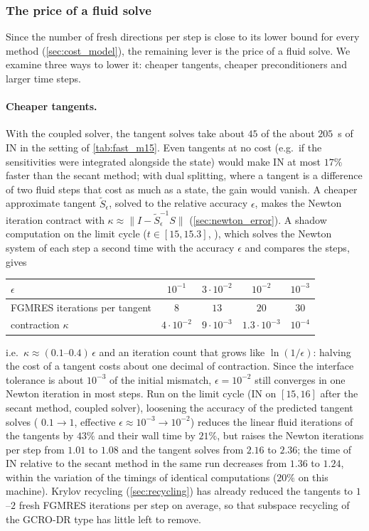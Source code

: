 \documentclass[11pt,a4paper]{article}
\theoremstyle{definition}
\theoremstyle{remark}
\begin{document}
\subsubsection{The price of a fluid solve}\label{sec:fast_fluid}

Since the number of fresh directions per step is close to its lower bound for every method
(\cref{sec:cost_model}), the remaining lever is the price of a fluid solve. We examine three ways
to lower it: cheaper tangents, cheaper preconditioners and larger time steps.

\paragraph{Cheaper tangents.} With the coupled solver, the tangent solves take about $45$ of the
about $205$~s of IN in the setting of \cref{tab:fast_m15}. Even tangents at no cost (e.g.\ if the sensitivities
were integrated alongside the state) would make IN at most $17\%$ faster than the secant method;
with dual splitting, where a tangent is a difference of two fluid steps that cost as much as a
state, the gain would vanish. A cheaper approximate tangent $\tilde S_\epsilon$, solved to the
relative accuracy $\epsilon$, makes the Newton iteration contract with
$\kappa\approx\|I-\tilde S_\epsilon^{-1}S\|$ (\cref{sec:newton_error}). A shadow computation on the
limit cycle ($t\in[15,15.3]$, ), which solves the Newton system of
each step a second time with the accuracy $\epsilon$ and compares the steps, gives
\begin{center}
\begin{tabular}{lcccc}
\toprule
$\epsilon$ & $10^{-1}$ & $3\cdot10^{-2}$ & $10^{-2}$ & $10^{-3}$\\
\midrule
FGMRES iterations per tangent & $8$ & $13$ & $20$ & $30$\\
contraction $\kappa$ & $4\cdot10^{-2}$ & $9\cdot10^{-3}$ & $1.3\cdot10^{-3}$ & $10^{-4}$\\
\bottomrule
\end{tabular}
\end{center}
i.e.\ $\kappa\approx(0.1\text{--}0.4)\,\epsilon$ and an iteration count that grows like
$\ln(1/\epsilon)$: halving the cost of a tangent costs about one decimal of contraction. Since the
interface tolerance is about $10^{-3}$ of the initial mismatch, $\epsilon=10^{-2}$ still converges in
one Newton iteration in most steps. Run on the limit cycle (IN on $[15,16]$ after the secant method,
coupled solver), loosening the accuracy of the predicted tangent solves
( $0.1\to1$, effective $\epsilon\approx10^{-3}\to10^{-2}$)
reduces the linear fluid iterations of the tangents by $43\%$ and their wall time by $21\%$, but
raises the Newton iterations per step from $1.01$ to $1.08$ and the tangent solves from $2.16$ to
$2.36$; the time of IN relative to the secant method in the same run decreases from $1.36$ to
$1.24$, within the variation of the timings of identical computations ($20\%$ on this machine).
Krylov recycling (\cref{sec:recycling}) has already reduced the tangents to $1$--$2$ fresh FGMRES
iterations per step on average, so that subspace recycling of the GCRO-DR type has little left to
remove.
\end{document}
